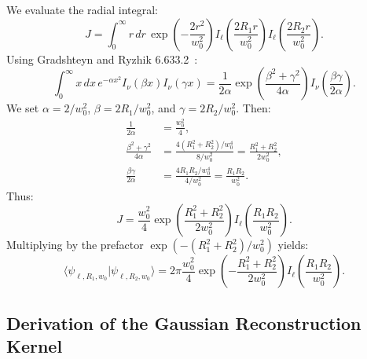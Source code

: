 \documentclass[11pt,a4paper]{article}
\begin{document}
We evaluate the radial integral:
\begin{equation}
J = \int_0^\infty r \, dr \, \exp\left( - \frac{2 r^2}{w_0^2} \right) I_\ell\left( \frac{2 R_1 r}{w_0^2} \right) I_\ell\left( \frac{2 R_2 r}{w_0^2} \right).
\end{equation}
Using Gradshteyn and Ryzhik 6.633.2~\cite{Gradshteyn2014}:
\begin{equation}
\int_0^\infty x \, dx \, e^{-\alpha x^2} I_\nu(\beta x) I_\nu(\gamma x) = \frac{1}{2\alpha} \exp\left( \frac{\beta^2 + \gamma^2}{4\alpha} \right) I_\nu\left( \frac{\beta \gamma}{2\alpha} \right).
\end{equation}
We set $\alpha = 2 / w_0^2$, $\beta = 2 R_1 / w_0^2$, and $\gamma = 2 R_2 / w_0^2$. Then:
\begin{align}
\frac{1}{2\alpha} &= \frac{w_0^2}{4}, \\
\frac{\beta^2 + \gamma^2}{4\alpha} &= \frac{4(R_1^2 + R_2^2) / w_0^4}{8 / w_0^2} = \frac{R_1^2 + R_2^2}{2 w_0^2}, \\
\frac{\beta \gamma}{2\alpha} &= \frac{4 R_1 R_2 / w_0^4}{4 / w_0^2} = \frac{R_1 R_2}{w_0^2}.
\end{align}
Thus:
\begin{equation}
J = \frac{w_0^2}{4} \exp\left( \frac{R_1^2 + R_2^2}{2 w_0^2} \right) I_\ell\left( \frac{R_1 R_2}{w_0^2} \right).
\end{equation}
Multiplying by the prefactor $\exp(-(R_1^2 + R_2^2)/w_0^2)$ yields:
\begin{equation}
\langle \psi_{\ell, R_1, w_0} | \psi_{\ell, R_2, w_0} \rangle = 2\pi \frac{w_0^2}{4} \exp\left( - \frac{R_1^2 + R_2^2}{2 w_0^2} \right) I_\ell\left( \frac{R_1 R_2}{w_0^2} \right).
\end{equation}

\subsection{Derivation of the Gaussian Reconstruction Kernel}
\end{document}
